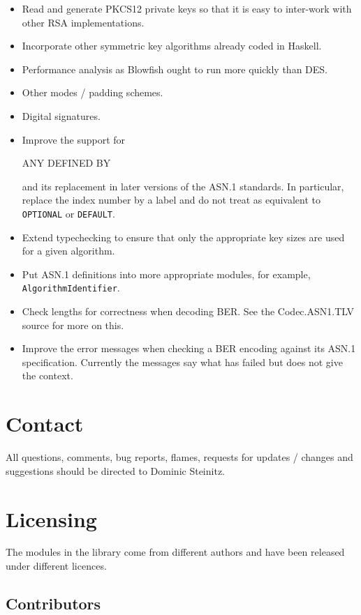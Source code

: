 \documentclass{article}
\begin{document}
\begin{itemize}
\item
Read and generate PKCS12 private keys so that it is easy to inter-work 
with other RSA implementations.
\item
Incorporate other symmetric key algorithms already coded in Haskell.
\item
Performance analysis as Blowfish ought to run more quickly than DES.
\item
Other modes / padding schemes.
\item
Digital signatures.
\item
Improve the support for {\begin{tt}ANY DEFINED BY\end{tt}} and its replacement
in later versions of the ASN.1 standards. In particular, replace the index
number by a label and do not treat as equivalent to {\tt OPTIONAL} or
{\tt DEFAULT}.
\item
Extend typechecking to ensure that only the appropriate key sizes are used
for a given algorithm.
\item
Put ASN.1 definitions into more appropriate modules, for example,
{\tt AlgorithmIdentifier}.
\item
Check lengths for correctness when decoding BER. See the Codec.ASN1.TLV
source for more on this.
\item
Improve the error messages when checking a BER encoding against its ASN.1
specification. Currently the messages say what has failed but does not
give the context.
\end{itemize}

\section{Contact}

All questions, comments, bug reports, flames, requests for 
updates / changes and suggestions should be directed to Dominic Steinitz.

\section{Licensing}

The modules in the library come from different authors and have been 
released under different licences. 

\subsection{Contributors}
\end{document}
